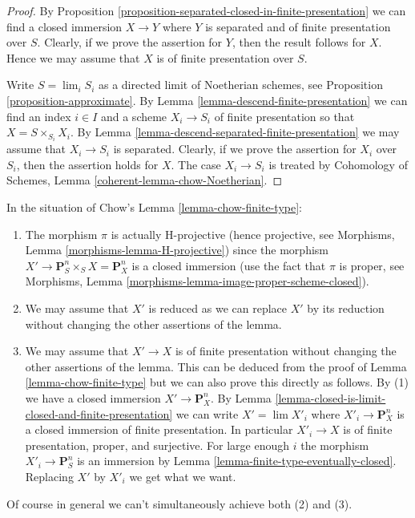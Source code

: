\begin{proof}
By Proposition \ref{proposition-separated-closed-in-finite-presentation}
we can find a closed immersion $X \to Y$ where $Y$ is separated
and of finite presentation over $S$. Clearly, if we prove the assertion
for $Y$, then the result follows for $X$. Hence we may assume that
$X$ is of finite presentation over $S$.

\medskip\noindent
Write $S = \lim_i S_i$ as a directed limit of Noetherian schemes, see
Proposition \ref{proposition-approximate}. By
Lemma \ref{lemma-descend-finite-presentation} we can
find an index $i \in I$ and a scheme $X_i \to S_i$ of finite presentation
so that $X = S \times_{S_i} X_i$.
By Lemma \ref{lemma-descend-separated-finite-presentation}
we may assume that $X_i \to S_i$ is separated.
Clearly, if we prove the assertion for
$X_i$ over $S_i$, then the assertion holds for $X$. The case
$X_i \to S_i$ is treated by
Cohomology of Schemes, Lemma \ref{coherent-lemma-chow-Noetherian}.
\end{proof}

\begin{remark}
\label{remark-chow-finite-type}
In the situation of Chow's Lemma \ref{lemma-chow-finite-type}:
\begin{enumerate}
\item The morphism $\pi$ is actually H-projective (hence projective, see
Morphisms, Lemma \ref{morphisms-lemma-H-projective})
since the morphism $X' \to \mathbf{P}^n_S \times_S X = \mathbf{P}^n_X$
is a closed immersion (use the fact that $\pi$ is proper, see
Morphisms, Lemma \ref{morphisms-lemma-image-proper-scheme-closed}).
\item We may assume that $X'$ is reduced as we can replace $X'$ by
its reduction without changing the other assertions of the lemma.
\item We may assume that $X' \to X$ is of finite presentation
without changing the other assertions of the lemma. This can be deduced
from the proof of Lemma \ref{lemma-chow-finite-type} but we can also prove
this directly as follows. By (1) we have a closed immersion
$X' \to \mathbf{P}^n_X$. By
Lemma \ref{lemma-closed-is-limit-closed-and-finite-presentation} we can write
$X' = \lim X'_i$ where $X'_i \to \mathbf{P}^n_X$ is a closed
immersion of finite presentation. In particular $X'_i \to X$ is
of finite presentation, proper, and surjective. For large enough
$i$ the morphism $X'_i \to \mathbf{P}^n_S$ is an immersion by
Lemma \ref{lemma-finite-type-eventually-closed}. Replacing
$X'$ by $X'_i$ we get what we want.
\end{enumerate}
Of course in general we can't simultaneously achieve both (2) and (3).
\end{remark}

